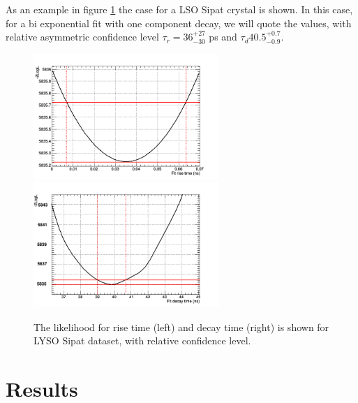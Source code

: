 As an example in figure \ref{fig:likelihood_sipat} the case for a LSO Sipat crystal is shown. In this case, for a bi exponential fit with one component decay, we will quote the values, with relative asymmetric confidence level $\tau _{r} = 36_{-30}^{+27}$ ps and $\tau _{d}40.5_{-0.9}^{+0.7}$.
\begin{figure}[htbp]
\begin{center}
\includegraphics[width=7cm]{../Pictures/Chapter_7/rise_sipat.png}
\includegraphics[width=7cm]{../Pictures/Chapter_7/decay_like_2.png}
\end{center}
\caption[Likelihood for Sipat LYSO]{The likelihood for rise time (left) and decay time (right) is shown for LYSO Sipat dataset, with relative confidence level.}
\label{fig:likelihood_sipat}
\end{figure}

\section{Results}
